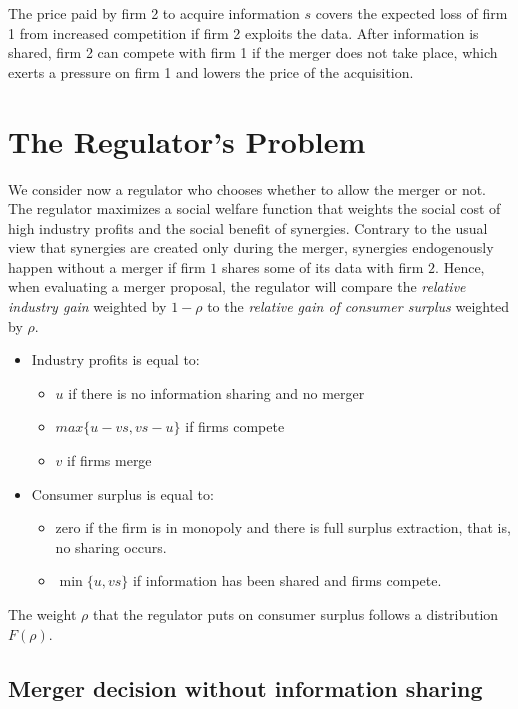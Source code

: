 \documentclass[a4paper,leqno]{article}%
\begin{document}
\medskip

The price paid by firm 2 to acquire information $s$ covers the expected loss of firm 1 from increased competition if firm 2 exploits the data. After information is shared, firm 2 can compete with firm 1 if the merger does not take place, which exerts a pressure on firm 1 and lowers the price of the acquisition. 

\medskip

\section{The Regulator's Problem}

We consider now a regulator who chooses whether to allow the merger or not. The regulator maximizes a social welfare function that weights the social cost of high industry profits and the social benefit of synergies. Contrary to the usual view that synergies are created only during the merger, synergies endogenously happen without a merger if firm $1$ shares some of its data with firm $2$. Hence, when evaluating a merger proposal, the regulator will compare the \emph{relative industry gain} weighted by $1-\rho$ to the \emph{relative gain of consumer surplus} weighted by $\rho$.


\begin{itemize}
    \item Industry profits is equal to:
    \begin{itemize}
        \item $u$ if there is no information sharing and no merger
        \item $max\{u-v s,v s-u\}$ if firms compete
        \item $v$ if firms merge
    \end{itemize}
    \item Consumer surplus is equal to:
    \begin{itemize}
        \item zero if the firm is in monopoly and there is full surplus extraction, that is, no sharing occurs.
        \item $\min\{u,v s\}$ if information has been shared and firms compete.
    \end{itemize}
\end{itemize}

The weight $\rho$ that the regulator puts on consumer surplus follows a distribution $F(\rho)$.

\subsection{Merger decision without information sharing}
\end{document}
